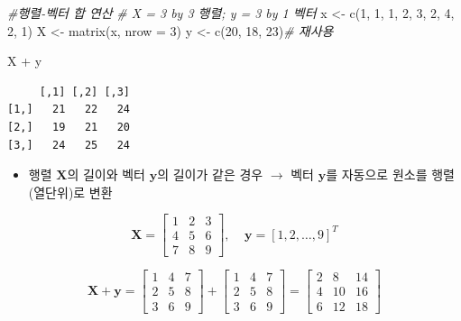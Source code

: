 \documentclass[
  11pt,
]{krantz}
\newenvironment{Shaded}{\begin{snugshade}}{\end{snugshade}}
\newcommand{\AttributeTok}[1]{\textcolor[rgb]{0.61,0.61,0.61}{#1}}
\newcommand{\CommentTok}[1]{\textcolor[rgb]{0.37,0.37,0.37}{\textit{#1}}}
\newcommand{\DecValTok}[1]{\textcolor[rgb]{0.06,0.06,0.06}{#1}}
\newcommand{\FunctionTok}[1]{\textcolor[rgb]{0,0,0}{#1}}
\newcommand{\NormalTok}[1]{#1}
\newcommand{\OtherTok}[1]{\textcolor[rgb]{0.37,0.37,0.37}{#1}}
\newcommand{\SpecialCharTok}[1]{\textcolor[rgb]{0,0,0}{#1}}
\providecommand{\tightlist}{%
  \setlength{\itemsep}{0pt}\setlength{\parskip}{0pt}}
\begin{document}
\footnotesize

\begin{Shaded}
\begin{Highlighting}[]
\CommentTok{\#행렬{-}벡터 합 연산}
\CommentTok{\# X = 3 by 3 행렬; y = 3 by 1 벡터}
\NormalTok{x }\OtherTok{\textless{}{-}} \FunctionTok{c}\NormalTok{(}\DecValTok{1}\NormalTok{, }\DecValTok{1}\NormalTok{, }\DecValTok{1}\NormalTok{, }\DecValTok{2}\NormalTok{, }\DecValTok{3}\NormalTok{, }\DecValTok{2}\NormalTok{, }\DecValTok{4}\NormalTok{, }\DecValTok{2}\NormalTok{, }\DecValTok{1}\NormalTok{)}
\NormalTok{X }\OtherTok{\textless{}{-}} \FunctionTok{matrix}\NormalTok{(x, }\AttributeTok{nrow =} \DecValTok{3}\NormalTok{)}
\NormalTok{y }\OtherTok{\textless{}{-}} \FunctionTok{c}\NormalTok{(}\DecValTok{20}\NormalTok{, }\DecValTok{18}\NormalTok{, }\DecValTok{23}\NormalTok{)}\CommentTok{\# 재사용}

\NormalTok{X }\SpecialCharTok{+}\NormalTok{ y}
\end{Highlighting}
\end{Shaded}

\begin{verbatim}
     [,1] [,2] [,3]
[1,]   21   22   24
[2,]   19   21   20
[3,]   24   25   24
\end{verbatim}

\normalsize

\begin{itemize}
\tightlist
\item
  행렬 \(\mathrm{\mathbf{X}}\)의 길이와 벡터 \(\mathrm{\mathbf y}\)의 길이가 같은 경우 \(\rightarrow\) 벡터 \(\mathrm{\mathbf y}\)를 자동으로 원소를 행렬(열단위)로 변환
\end{itemize}

\[\mathrm{\mathbf{X}} = 
\begin{bmatrix}
1 & 2 & 3\\
4 & 5 & 6\\
7 & 8 & 9
\end{bmatrix}, ~~~~~
\mathrm{\mathbf y} = [1, 2, \ldots, 9]^T
\]

\[\mathrm{\mathbf{X}} + \mathrm{\mathbf{y}} = 
\begin{bmatrix}
1 & 4 & 7\\
2 & 5 & 8\\
3 & 6 & 9
\end{bmatrix} + 
\begin{bmatrix}
1 & 4 & 7\\
2 & 5 & 8\\
3 & 6 & 9
\end{bmatrix} = 
\begin{bmatrix}
2 &  8  & 14\\
4 &  10 & 16\\
6 &  12 & 18
\end{bmatrix}
\]
\end{document}
